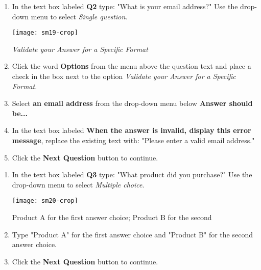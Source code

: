 \documentclass{tufte-handout}
\begin{document}
\begin{enumerate}
    \item In the text box labeled \textbf{Q2} type: "What is your email address?" Use the drop-down menu to select \textit{Single question}.
    
      \begin{marginfigure}%
        \texttt{[image: sm19-crop]}
        \caption{\textit{Validate your Answer for a Specific Format}}
        \label{fig:marginfig3}
    \end{marginfigure}    
    
    
    \item Click the word \textbf{Options} from the menu above the question text and place a check in the box next to the option \textit{Validate your Answer for a Specific Format}.
    \item Select \textbf{an email address} from the drop-down menu below \textbf{Answer should be...} 
    \item In the text box labeled \textbf{When the answer is invalid, display this error message}, replace the existing text with: "Please enter a valid email address."
    \item Click the \textbf{Next Question} button to continue.
\end{enumerate}


\begin{enumerate}
    \item In the text box labeled \textbf{Q3} type: "What product did you purchase?" Use the drop-down menu to select \textit{Multiple choice}. 
    
    \begin{marginfigure}%
        \texttt{[image: sm20-crop]}
        \caption{Product A for the first answer choice; Product B for the second}
        \label{fig:marginfig4}
    \end{marginfigure}      
    
    \item Type "Product A" for the first answer choice and "Product B" for the second answer choice.
    \item Click the \textbf{Next Question} button to continue.
\end{enumerate}
\end{document}
